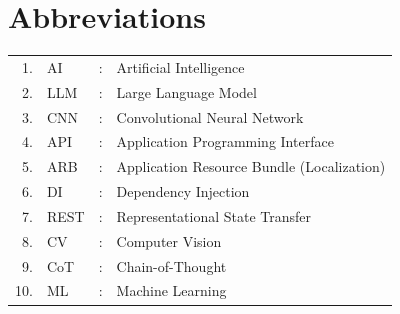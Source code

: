 \chapter*{Abbreviations}

\renewcommand{\arraystretch}{1.8}
\begin{tabular}{r l c p{9cm}}
  1.  & AI   & : & Artificial Intelligence \\
  2.  & LLM  & : & Large Language Model \\
  3.  & CNN  & : & Convolutional Neural Network \\
  4.  & API  & : & Application Programming Interface \\
  5.  & ARB  & : & Application Resource Bundle (Localization) \\
  6.  & DI   & : & Dependency Injection \\
  7.  & REST & : & Representational State Transfer \\
  8.  & CV   & : & Computer Vision \\
  9.  & CoT  & : & Chain-of-Thought \\
  10. & ML   & : & Machine Learning \\
\end{tabular}
\renewcommand{\arraystretch}{1}
